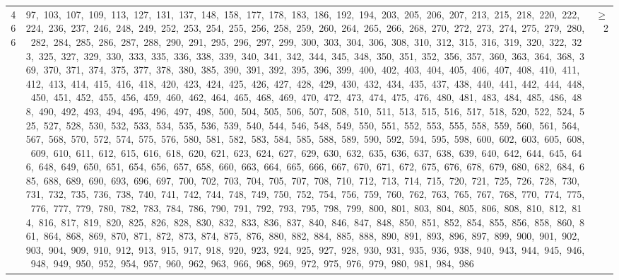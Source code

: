 \begin{longtable}{c|p{}|r}
466 & 97,\ 103,\ 107,\ 109,\ 113,\ 127,\ 131,\ 137,\ 148,\ 158,\ 177,\ 178,\ 183,\ 186,\ 192,\ 194,\ 203,\ 205,\ 206,\ 207,\ 213,\ 215,\ 218,\ 220,\ 222,\ 224,\ 236,\ 237,\ 246,\ 248,\ 249,\ 252,\ 253,\ 254,\ 255,\ 256,\ 258,\ 259,\ 260,\ 264,\ 265,\ 266,\ 268,\ 270,\ 272,\ 273,\ 274,\ 275,\ 279,\ 280,\ 282,\ 284,\ 285,\ 286,\ 287,\ 288,\ 290,\ 291,\ 295,\ 296,\ 297,\ 299,\ 300,\ 303,\ 304,\ 306,\ 308,\ 310,\ 312,\ 315,\ 316,\ 319,\ 320,\ 322,\ 323,\ 325,\ 327,\ 329,\ 330,\ 333,\ 335,\ 336,\ 338,\ 339,\ 340,\ 341,\ 342,\ 344,\ 345,\ 348,\ 350,\ 351,\ 352,\ 356,\ 357,\ 360,\ 363,\ 364,\ 368,\ 369,\ 370,\ 371,\ 374,\ 375,\ 377,\ 378,\ 380,\ 385,\ 390,\ 391,\ 392,\ 395,\ 396,\ 399,\ 400,\ 402,\ 403,\ 404,\ 405,\ 406,\ 407,\ 408,\ 410,\ 411,\ 412,\ 413,\ 414,\ 415,\ 416,\ 418,\ 420,\ 423,\ 424,\ 425,\ 426,\ 427,\ 428,\ 429,\ 430,\ 432,\ 434,\ 435,\ 437,\ 438,\ 440,\ 441,\ 442,\ 444,\ 448,\ 450,\ 451,\ 452,\ 455,\ 456,\ 459,\ 460,\ 462,\ 464,\ 465,\ 468,\ 469,\ 470,\ 472,\ 473,\ 474,\ 475,\ 476,\ 480,\ 481,\ 483,\ 484,\ 485,\ 486,\ 488,\ 490,\ 492,\ 493,\ 494,\ 495,\ 496,\ 497,\ 498,\ 500,\ 504,\ 505,\ 506,\ 507,\ 508,\ 510,\ 511,\ 513,\ 515,\ 516,\ 517,\ 518,\ 520,\ 522,\ 524,\ 525,\ 527,\ 528,\ 530,\ 532,\ 533,\ 534,\ 535,\ 536,\ 539,\ 540,\ 544,\ 546,\ 548,\ 549,\ 550,\ 551,\ 552,\ 553,\ 555,\ 558,\ 559,\ 560,\ 561,\ 564,\ 567,\ 568,\ 570,\ 572,\ 574,\ 575,\ 576,\ 580,\ 581,\ 582,\ 583,\ 584,\ 585,\ 588,\ 589,\ 590,\ 592,\ 594,\ 595,\ 598,\ 600,\ 602,\ 603,\ 605,\ 608,\ 609,\ 610,\ 611,\ 612,\ 615,\ 616,\ 618,\ 620,\ 621,\ 623,\ 624,\ 627,\ 629,\ 630,\ 632,\ 635,\ 636,\ 637,\ 638,\ 639,\ 640,\ 642,\ 644,\ 645,\ 646,\ 648,\ 649,\ 650,\ 651,\ 654,\ 656,\ 657,\ 658,\ 660,\ 663,\ 664,\ 665,\ 666,\ 667,\ 670,\ 671,\ 672,\ 675,\ 676,\ 678,\ 679,\ 680,\ 682,\ 684,\ 685,\ 688,\ 689,\ 690,\ 693,\ 696,\ 697,\ 700,\ 702,\ 703,\ 704,\ 705,\ 707,\ 708,\ 710,\ 712,\ 713,\ 714,\ 715,\ 720,\ 721,\ 725,\ 726,\ 728,\ 730,\ 731,\ 732,\ 735,\ 736,\ 738,\ 740,\ 741,\ 742,\ 744,\ 748,\ 749,\ 750,\ 752,\ 754,\ 756,\ 759,\ 760,\ 762,\ 763,\ 765,\ 767,\ 768,\ 770,\ 774,\ 775,\ 776,\ 777,\ 779,\ 780,\ 782,\ 783,\ 784,\ 786,\ 790,\ 791,\ 792,\ 793,\ 795,\ 798,\ 799,\ 800,\ 801,\ 803,\ 804,\ 805,\ 806,\ 808,\ 810,\ 812,\ 814,\ 816,\ 817,\ 819,\ 820,\ 825,\ 826,\ 828,\ 830,\ 832,\ 833,\ 836,\ 837,\ 840,\ 846,\ 847,\ 848,\ 850,\ 851,\ 852,\ 854,\ 855,\ 856,\ 858,\ 860,\ 861,\ 864,\ 868,\ 869,\ 870,\ 871,\ 872,\ 873,\ 874,\ 875,\ 876,\ 880,\ 882,\ 884,\ 885,\ 888,\ 890,\ 891,\ 893,\ 896,\ 897,\ 899,\ 900,\ 901,\ 902,\ 903,\ 904,\ 909,\ 910,\ 912,\ 913,\ 915,\ 917,\ 918,\ 920,\ 923,\ 924,\ 925,\ 927,\ 928,\ 930,\ 931,\ 935,\ 936,\ 938,\ 940,\ 943,\ 944,\ 945,\ 946,\ 948,\ 949,\ 950,\ 952,\ 954,\ 957,\ 960,\ 962,\ 963,\ 966,\ 968,\ 969,\ 972,\ 975,\ 976,\ 979,\ 980,\ 981,\ 984,\ 986 & $\ge$ 2 \\

\end{longtable}
